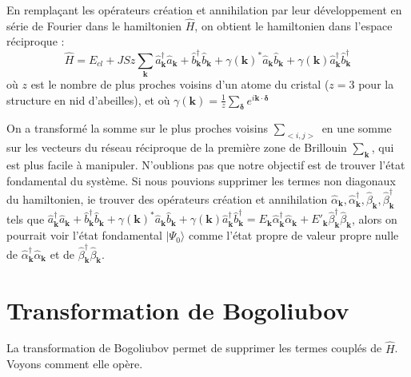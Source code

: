 \documentclass[a4paper, french]{report}
\newcommand{\an}{\hat{a}}
\newcommand{\cre}{\hat{a}^\dagger}
\newcommand{\h}{\ensuremath{\hat{H}}\xspace}
\newcommand{\blbl}{création et annihilation }
\newcommand{\ban}{\hat{b}}
\newcommand{\bcre}{\hat{b}^\dagger}
\newcommand{\fond}{\ensuremath{| \Psi_0 \rangle}\xspace}
\newcommand{\ond}{\ensuremath{\mathbf{k}\xspace}}
\newcommand{\ank}{\an_{\ond}}
\newcommand{\crek}{\cre_{\ond}}
\newcommand{\bank}{\ban_{\ond}}
\newcommand{\bcrek}{\bcre_{\ond}}
\newcommand{\gam}{\gamma(\ond{})}
\newcommand{\alcre}{\hat{\alpha}^\dagger_{\ond}}
\newcommand{\alan}{\hat{\alpha}_{\ond}}
\newcommand{\betcre}{\hat{\beta}^\dagger_{\ond}}
\newcommand{\betan}{\hat{\beta}_{\ond}}
\newcommand{\1}{\ensuremath{\ket{\om_1\bom_1}}\xspace}
\newcommand{\2}{\ensuremath{\ket{\om_2\bom_2}}\xspace}
\begin{document}
En remplaçant les opérateurs \blbl par leur développement en série de Fourier dans le hamiltonien \h, on obtient le hamiltonien dans l'espace réciproque :
\begin{equation}
	\h=E_{cl}+JSz\sum_{\ond}\crek\ank+\bcrek\bank+\gam^*\ank\bank+\gam\crek\bcrek
\end{equation}
où $z$ est le nombre de plus proches voisins d'un atome du cristal ($z=3$ pour la structure en nid d'abeilles), et où $\gam=\frac{1}{z}\sum_{\boldsymbol{\delta}}e^{i\ond\cdot\boldsymbol{\delta}}$

On a transformé la somme sur le plus proches voisins $\sum_{<i,j>}$ en une somme sur les vecteurs du réseau réciproque de la première zone de Brillouin $\sum_{\ond}$, qui est plus facile à manipuler. N'oublions pas que notre objectif est de trouver l'état fondamental du système. Si nous pouvions supprimer les termes non diagonaux du hamiltonien, ie trouver des opérateurs \blbl $\alan, \alcre, \betan, \betcre$ tels que $\crek\ank+\bcrek\bank+\gam^*\ank\bank+\gam\crek\bcrek=E_{\ond}\alcre\alan+E'_{\ond}\betcre\betan$, alors on pourrait voir l'état fondamental \fond comme l'état propre de valeur propre nulle de $\alcre\alan$ et de $\betcre\betan$.

\section{Transformation de Bogoliubov}
La transformation de Bogoliubov permet de supprimer les termes couplés de \h. Voyons comment elle opère.
\end{document}
